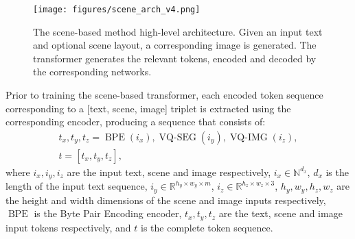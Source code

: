 \documentclass[final]{cvpr}
\begin{document}
\begin{figure}[h]
    \centering
    \texttt{[image: figures/scene\_arch\_v4.png]}
    \caption{The scene-based method high-level architecture. Given an input text and optional scene layout, a corresponding image is generated. The transformer generates the relevant tokens, encoded and decoded by the corresponding networks.}
    \label{fig:arch_scene_v1}
\end{figure}

Prior to training the scene-based transformer, each encoded token sequence corresponding to a [text, scene, image] triplet is extracted using the corresponding encoder, producing a sequence that consists of:
\begin{gather*}
t_x, t_y, t_z = \operatorname{BPE}(i_x), \operatorname{VQ-SEG}(i_y), \operatorname{VQ-IMG}(i_z),  \\
t = [t_x, t_y, t_z],
\end{gather*}
where $i_x, i_y, i_z$ are the input text, scene and image respectively, $i_x \in \mathbb{N}^{d_x}$, $d_x$ is the length of the input text sequence, $i_y \in \mathbb{R}^{h_y \times w_y \times m}$, $i_z \in \mathbb{R}^{h_z \times w_z \times 3}$, $h_y,w_y,h_z,w_z$ are the height and width dimensions of the scene and image inputs respectively, $\operatorname{BPE}$ is the Byte Pair Encoding encoder, $t_x, t_y, t_z$ are the text, scene and image input tokens respectively, and $t$ is the complete token sequence.
\end{document}
